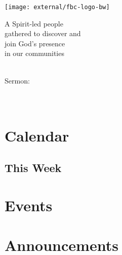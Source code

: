 \documentclass[
notumble,
nofoldmark,
letterpaper,
11pt,
]{leaflet}
\date{\formatdate{#3}{#2}{#1}}%
\begin{document}
\begin{titlepage}
\centering
\vfill
{\centering
\texttt{[image: external/fbc-logo-bw]}\par}
\vfill
\large A Spirit-led people \\ gathered to discover and \\ join God's presence \\ in our communities
\vfill

\LARGE\sundaydate\\
\vfill
\large Sermon:\\
\LARGE\sermontitle\\
\LARGE\scripture\\

\vfill
\end{titlepage}

\thispagestyle{empty}

\section{\faCalendar \hspace{.5em} Calendar}



\subsection{This Week}


\vfill

\pagebreak

\section{\faCalendarPlusO \hspace{.5em} Events}

\vfill




\vfill

\pagebreak

\section{\faBullhorn \hspace{.5em} Announcements}

\vfill




\end{document}
